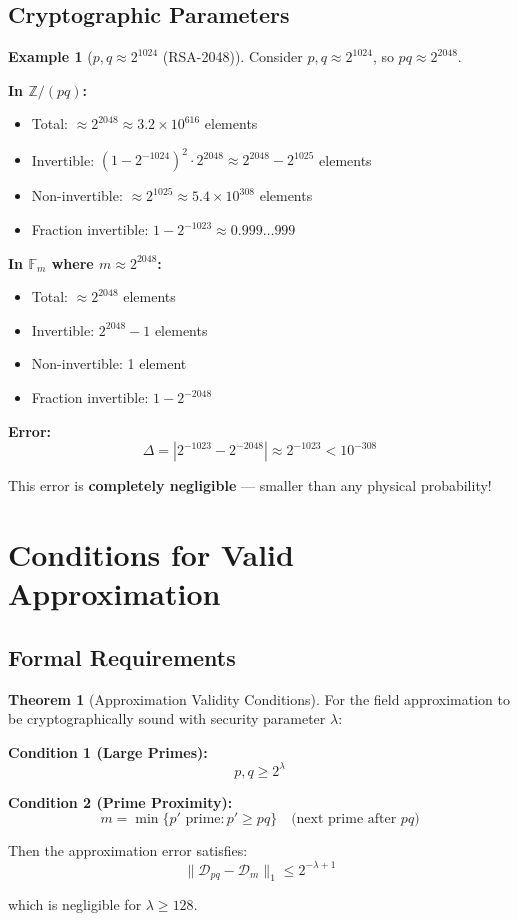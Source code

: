\documentclass[11pt]{article}
\theoremstyle{definition}
\newtheorem{theorem}{Theorem}
\newtheorem{example}{Example}
\begin{document}
\subsection{Cryptographic Parameters}

\begin{example}[$p,q \approx 2^{1024}$ (RSA-2048)]
Consider $p,q \approx 2^{1024}$, so $pq \approx 2^{2048}$.

\textbf{In $\mathbb{Z}/(pq)$:}
\begin{itemize}
\item Total: $\approx 2^{2048} \approx 3.2 \times 10^{616}$ elements
\item Invertible: $(1 - 2^{-1024})^2 \cdot 2^{2048} \approx 2^{2048} - 2^{1025}$ elements
\item Non-invertible: $\approx 2^{1025} \approx 5.4 \times 10^{308}$ elements
\item Fraction invertible: $1 - 2^{-1023} \approx 0.999\ldots999$
\end{itemize}

\textbf{In $\mathbb{F}_m$ where $m \approx 2^{2048}$:}
\begin{itemize}
\item Total: $\approx 2^{2048}$ elements
\item Invertible: $2^{2048} - 1$ elements
\item Non-invertible: 1 element
\item Fraction invertible: $1 - 2^{-2048}$
\end{itemize}

\textbf{Error:}
\[
\Delta = |2^{-1023} - 2^{-2048}| \approx 2^{-1023} < 10^{-308}
\]

This error is \textbf{completely negligible} --- smaller than any physical probability!
\end{example}

\section{Conditions for Valid Approximation}

\subsection{Formal Requirements}

\begin{theorem}[Approximation Validity Conditions]
For the field approximation to be cryptographically sound with security parameter $\lambda$:

\textbf{Condition 1 (Large Primes):}
\[
p, q \geq 2^\lambda
\]

\textbf{Condition 2 (Prime Proximity):}
\[
m = \min\{p' \text{ prime} : p' \geq pq\} \quad \text{(next prime after } pq\text{)}
\]

Then the approximation error satisfies:
\[
\|\mathcal{D}_{pq} - \mathcal{D}_m\|_1 \leq 2^{-\lambda+1}
\]

which is negligible for $\lambda \geq 128$.
\end{theorem}
\end{document}
